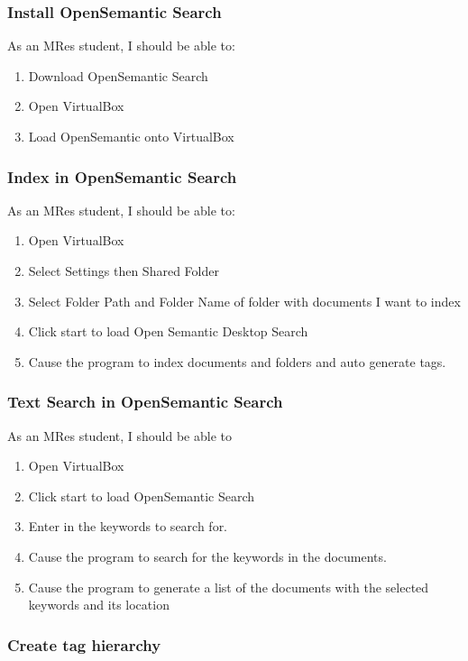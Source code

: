 \documentclass{article}
\begin{document}
\subsubsection*{Install OpenSemantic Search}

As an MRes student, I should be able to:
\begin{enumerate}
\item Download OpenSemantic Search
\item Open VirtualBox
\item Load OpenSemantic onto VirtualBox
\end{enumerate}

\subsubsection*{Index in OpenSemantic Search}

As an MRes student, I should be able to:
\begin{enumerate}
\item Open VirtualBox
\item Select Settings then Shared Folder
\item Select Folder Path and Folder Name of folder with documents I want to index
\item Click start to load Open Semantic Desktop Search
\item Cause the program to index documents and folders and auto generate tags.
\end{enumerate}

\subsubsection*{Text Search in OpenSemantic Search}

As an MRes student, I should be able to
\begin{enumerate}
\item Open VirtualBox
\item Click start to load OpenSemantic Search
\item Enter in the keywords to search for.
\item Cause the program to search for the keywords in the documents.
\item Cause the program to generate a list of the documents with the selected keywords and its location
\end{enumerate}

\subsubsection*{Create tag hierarchy}
\end{document}
